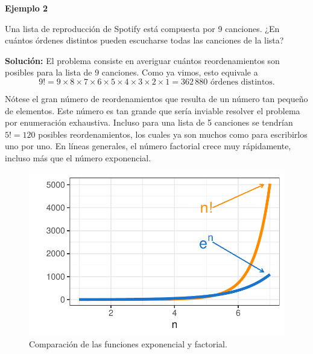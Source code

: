 \documentclass[
  letterpaper,
  DIV=11,
  numbers=noendperiod]{scrreprt}
\begin{document}
\begin{examplebox}

\begin{center}
\textbf{Ejemplo 2}

\end{center}

Una lista de reproducción de Spotify está compuesta por 9 canciones. ¿En
cuántos órdenes distintos pueden escucharse todas las canciones de la
lista?

\textbf{Solución:} El problema consiste en averiguar cuántos
reordenamientos son posibles para la lista de 9 canciones. Como ya
vimos, esto equivale a
\[9! = 9 \times 8 \times 7 \times 6 \times 5 \times 4 \times 3 \times 2 \times 1 = 362\,880 \text{ órdenes distintos.}\]

\end{examplebox}

Nótese el gran número de reordenamientos que resulta de un número tan
pequeño de elementos. Este número es tan grande que sería inviable
resolver el problema por enumeración exhaustiva. Incluso para una lista
de 5 canciones se tendrían \(5!=120\) posibles reordenamientos, los
cuales ya son muchos como para escribirlos uno por uno. En líneas
generales, el número factorial crece muy rápidamente, incluso más que el
número exponencial.

\begin{figure}

{\centering \includegraphics{conteo_files/figure-pdf/fig-crecimiento-factorial-1.pdf}

}

\caption{\label{fig-crecimiento-factorial}Comparación de las funciones
exponencial y factorial.}

\end{figure}
\end{document}
